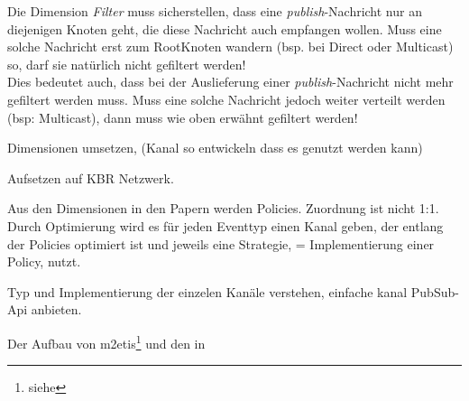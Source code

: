 \begin{table}[!h]
\caption{Verbindungsmatrix}
\label{tab:verbindungsmatrix}
\end{table}




Die Dimension \emph{Filter} muss sicherstellen, dass eine \emph{publish}-Nachricht nur an diejenigen Knoten geht, die diese Nachricht auch empfangen wollen. Muss eine solche Nachricht erst zum RootKnoten wandern (bsp. bei Direct oder Multicast) so, darf sie natürlich nicht gefiltert werden!\\
Dies bedeutet auch, dass bei der Auslieferung einer \emph{publish}-Nachricht nicht mehr gefiltert werden muss. Muss eine solche Nachricht jedoch weiter verteilt werden (bsp: Multicast), dann muss wie oben erwähnt gefiltert werden!


\cite{Fischer2010a, Fischer2010Event}


\cite{BeFiMu2006PubSubQoS}


Dimensionen umsetzen, (Kanal so entwickeln dass es genutzt werden kann)

Aufsetzen auf KBR Netzwerk.

Aus den Dimensionen in den Papern werden Policies. Zuordnung ist nicht 1:1. Durch Optimierung wird es für jeden Eventtyp einen Kanal geben, der entlang der Policies optimiert ist und jeweils eine Strategie, = Implementierung einer Policy, nutzt.

Typ und Implementierung der einzelen Kanäle verstehen, einfache kanal PubSub-Api anbieten.

Der Aufbau von \ac{m2etis}\footnote{siehe } und den in \cite{Fischer2010Event}





